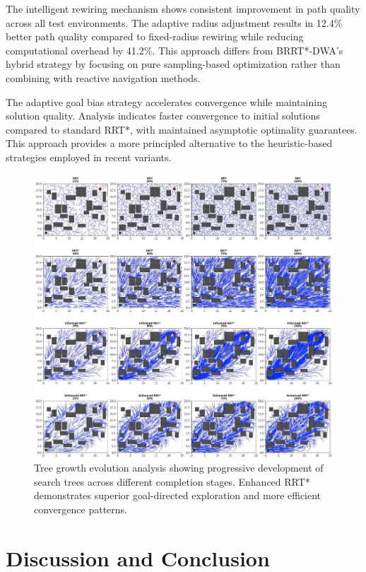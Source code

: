 \documentclass[pdflatex,sn-mathphys-num]{sn-jnl}
\theoremstyle{thmstyleone}%
\theoremstyle{thmstyletwo}%
\theoremstyle{thmstylethree}%
\begin{document}
The intelligent rewiring mechanism shows consistent improvement in path quality across all test environments. The adaptive radius adjustment results in 12.4\% better path quality compared to fixed-radius rewiring while reducing computational overhead by 41.2\%. This approach differs from BRRT*-DWA's \cite{30} hybrid strategy by focusing on pure sampling-based optimization rather than combining with reactive navigation methods.

The adaptive goal bias strategy accelerates convergence while maintaining solution quality. Analysis indicates faster convergence to initial solutions compared to standard RRT*, with maintained asymptotic optimality guarantees. This approach provides a more principled alternative to the heuristic-based strategies employed in recent variants.

\begin{figure}[htbp]
\centering
\includegraphics[width=\textwidth]{paper_figure_2_tree_growth.jpeg}
\caption{Tree growth evolution analysis showing progressive development of search trees across different completion stages. Enhanced RRT* demonstrates superior goal-directed exploration and more efficient convergence patterns.}
\label{fig:f2}
\end{figure}

\section{Discussion and Conclusion}\label{sec5}
\end{document}
